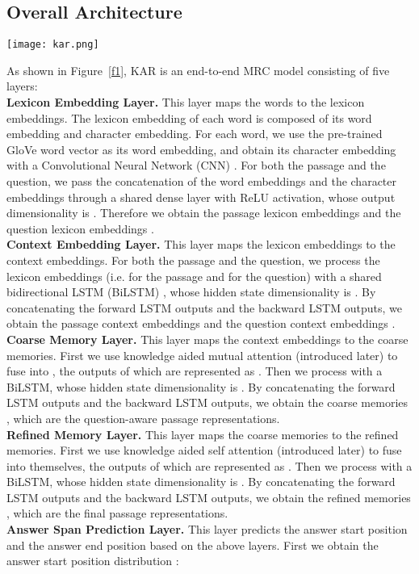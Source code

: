 \documentclass[11pt,a4paper]{article}
\begin{document}
\subsection{Overall Architecture}
\begin{figure*}
\centering
\texttt{[image: kar.png]}
\caption{\label{f1} An end-to-end MRC model: Knowledge Aided Reader (KAR)}
\end{figure*}
As shown in Figure~\ref{f1}, KAR is an end-to-end MRC model consisting of five layers: \\
\textbf{Lexicon Embedding Layer.} This layer maps the words to the lexicon embeddings. The lexicon embedding of each word is composed of its word embedding and character embedding. For each word, we use the pre-trained GloVe \cite{penningtonjeffrey:2014} word vector as its word embedding, and obtain its character embedding with a Convolutional Neural Network (CNN) \cite{kimyoon:2014}. For both the passage and the question, we pass the concatenation of the word embeddings and the character embeddings through a shared dense layer with ReLU activation, whose output dimensionality is . Therefore we obtain the passage lexicon embeddings  and the question lexicon embeddings . \\
\textbf{Context Embedding Layer.} This layer maps the lexicon embeddings to the context embeddings. For both the passage and the question, we process the lexicon embeddings (i.e.  for the passage and  for the question) with a shared bidirectional LSTM (BiLSTM) \cite{hochreitersepp:1997}, whose hidden state dimensionality is . By concatenating the forward LSTM outputs and the backward LSTM outputs, we obtain the passage context embeddings  and the question context embeddings . \\
\textbf{Coarse Memory Layer.} This layer maps the context embeddings to the coarse memories. First we use knowledge aided mutual attention (introduced later) to fuse  into , the outputs of which are represented as . Then we process  with a BiLSTM, whose hidden state dimensionality is . By concatenating the forward LSTM outputs and the backward LSTM outputs, we obtain the coarse memories , which are the question-aware passage representations. \\
\textbf{Refined Memory Layer.} This layer maps the coarse memories to the refined memories. First we use knowledge aided self attention (introduced later) to fuse  into themselves, the outputs of which are represented as . Then we process  with a BiLSTM, whose hidden state dimensionality is . By concatenating the forward LSTM outputs and the backward LSTM outputs, we obtain the refined memories , which are the final passage representations. \\
\textbf{Answer Span Prediction Layer.} This layer predicts the answer start position and the answer end position based on the above layers. First we obtain the answer start position distribution :
\end{document}
